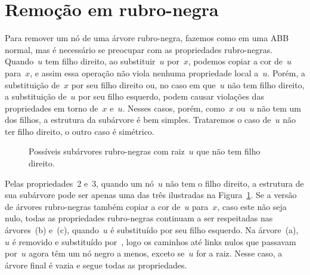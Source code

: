 \documentclass[main.tex]{subfiles}
\begin{document}
\section{Remoção em rubro-negra}

Para remover um nó de uma árvore rubro-negra, fazemos como em uma ABB normal, mas é necessário se preocupar com as propriedades rubro-negras. Quando~$u$ tem filho direito, ao substituir~$u$ por~$x$, podemos copiar a cor de~$u$ para~$x$, e assim essa operação não viola nenhuma propriedade local a~$u$. Porém, a substituição de~$x$ por seu filho direito ou, no caso em que~$u$ não tem filho direito, a substituição de~$u$ por seu filho esquerdo, podem causar violações das propriedades em torno de~$x$ e~$u$. Nesses casos, porém, como~$x$ ou~$u$ não tem um dos filhos, a estrutura da subárvore é bem simples. Trataremos o caso de~$u$ não ter filho direito, o outro caso é simétrico.

\begin{figure}
\centering
{}
\caption{Possíveis subárvores rubro-negras com raiz~$u$ que não tem filho direito.} \label{fig:rbnorchild}
\end{figure}

Pelas propriedades~2 e~3, quando um nó~$u$ não tem o filho direito, a estrutura de sua subárvore pode ser apenas uma das três ilustradas na Figura~\ref{fig:rbnorchild}.
Se a versão~ de árvores rubro-negras também copiar a cor de~$u$ para~$x$, caso este não seja nulo, todas as propriedades rubro-negras continuam a ser respeitadas nas árvores~(b) e~(c), quando~$u$ é substituído por seu filho esquerdo. Na árvore~(a),~$u$ é removido e substituído por~, logo os caminhos até links nulos que passavam por~$u$ agora têm um nó negro a menos, exceto se~$u$ for a raiz. Nesse caso, a árvore final é vazia e segue todas as propriedades.
\end{document}
